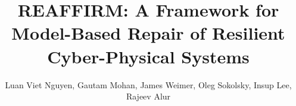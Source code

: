 \documentclass[sigconf]{acmart}
\begin{document}






%
\title{REAFFIRM: A Framework for Model-Based Repair of Resilient Cyber-Physical Systems}
\author{Luan Viet Nguyen, Gautam Mohan, James Weimer, Oleg Sokolsky, Insup Lee, Rajeev Alur\\}
\end{document}
